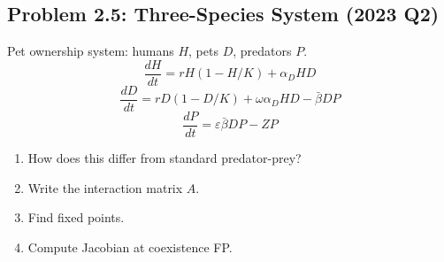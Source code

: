 \documentclass[10pt]{article}
\begin{document}
\subsection{Problem 2.5: Three-Species System (2023 Q2)}

\begin{problem}
Pet ownership system: humans $H$, pets $D$, predators $P$.
\[
\frac{dH}{dt} = rH(1 - H/K) + \alpha_D HD
\]
\[
\frac{dD}{dt} = rD(1-D/K) + \omega\alpha_D HD - \bar\beta DP
\]
\[
\frac{dP}{dt} = \varepsilon\bar\beta DP - ZP
\]
\begin{enumerate}[label=(\alph*)]
\item How does this differ from standard predator-prey?
\item Write the interaction matrix $A$.
\item Find fixed points.
\item Compute Jacobian at coexistence FP.
\end{enumerate}
\end{problem}
\end{document}
